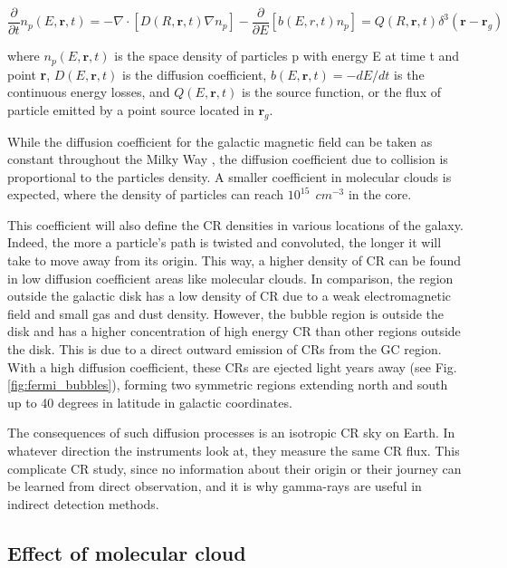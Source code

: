 \begin{equation}
\label{eq:diffusion}
\frac{\partial}{\partial t} n_p(E, \textbf{r}, t) = -\nabla \cdot \left[ D(R, \textbf{r}, t) \nabla n_p  \right] - \frac{\partial}{\partial E} \left[ b(E,r,t)n_p \right] = Q(R,\textbf{r},t) \delta^3(\textbf{r}-\textbf{r}_g)
\end{equation}

where $n_p(E,\textbf{r},t)$ is the space density of particles p with energy E at time t and point \textbf{r}, $D(E,\textbf{r},t)$ is the diffusion coefficient, $b(E,\textbf{r},t) = -dE/dt$ is the continuous energy losses, and $Q(E,\textbf{r},t)$ is the source function, or the flux of particle emitted by a point source located in $\textbf{r}_g$.

While the diffusion coefficient for the galactic magnetic field can be taken as constant throughout the Milky Way \cite{Farrar2012}, the diffusion coefficient due to collision is proportional to the particles density. A smaller coefficient in molecular clouds is expected, where the density of particles can reach $10^{15}\ \ cm^{-3}$ in the core. \cite{Blitz2000}

This coefficient will also define the CR densities in various locations of the galaxy. Indeed, the more a particle's path is twisted and convoluted, the longer it will take to move away from its origin. This way, a higher density of CR can be found in low diffusion coefficient areas like molecular clouds. In comparison, the region outside the galactic disk has a low density of CR due to a weak electromagnetic field and small gas and dust density.
However, the bubble region is outside the disk and has a higher concentration of high energy CR than other regions outside the disk. This is due to a direct outward emission of CRs from the GC region. With a high diffusion coefficient, these CRs are ejected light years away (see Fig. \ref{fig:fermi_bubbles}), forming two symmetric regions extending north and south up to 40 degrees in latitude in galactic coordinates.\cite{Ackermann2014}

The consequences of such diffusion processes is an isotropic CR sky on Earth. In whatever direction the instruments look at, they measure the same CR flux. This complicate CR study, since no information about their origin or their journey can be learned from direct observation, and it is why gamma-rays are useful in indirect detection methods.


\subsection{Effect of molecular cloud}

